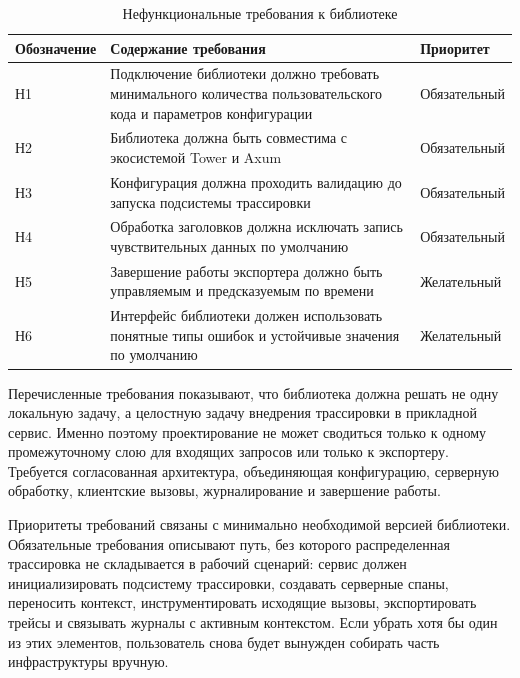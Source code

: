 \begin{table}[H]
    \centering
    \caption{Нефункциональные требования к библиотеке}
    \label{tab:nonfunctional-requirements}
    \renewcommand{\arraystretch}{1.2}
    \begin{tabularx}{\textwidth}{>{\raggedright\arraybackslash}p{1.6cm} >{\raggedright\arraybackslash}X >{\raggedright\arraybackslash}p{2.1cm}}
        \toprule
        Обозначение & Содержание требования & Приоритет \\
        \midrule
        Н1 & Подключение библиотеки должно требовать минимального количества пользовательского кода и параметров конфигурации & Обязательный \\
        \addlinespace
        Н2 & Библиотека должна быть совместима с экосистемой Tower и Axum~\cite{towerDocs,axumDocs} & Обязательный \\
        \addlinespace
        Н3 & Конфигурация должна проходить валидацию до запуска подсистемы трассировки & Обязательный \\
        \addlinespace
        Н4 & Обработка заголовков должна исключать запись чувствительных данных по умолчанию & Обязательный \\
        \addlinespace
        Н5 & Завершение работы экспортера должно быть управляемым и предсказуемым по времени & Желательный \\
        \addlinespace
        Н6 & Интерфейс библиотеки должен использовать понятные типы ошибок и устойчивые значения по умолчанию & Желательный \\
        \bottomrule
    \end{tabularx}
\end{table}

Перечисленные требования показывают, что библиотека должна решать не одну
локальную задачу, а целостную задачу внедрения трассировки в прикладной сервис.
Именно поэтому проектирование не может сводиться только к одному промежуточному
слою для входящих запросов или только к экспортеру. Требуется согласованная
архитектура, объединяющая конфигурацию, серверную обработку, клиентские вызовы,
журналирование и завершение работы.

Приоритеты требований связаны с минимально необходимой версией библиотеки.
Обязательные требования описывают путь, без которого распределенная трассировка
не складывается в рабочий сценарий: сервис должен инициализировать подсистему
трассировки, создавать серверные спаны, переносить контекст, инструментировать
исходящие вызовы, экспортировать трейсы и связывать журналы с активным контекстом.
Если убрать хотя бы один из этих элементов, пользователь снова будет вынужден
собирать часть инфраструктуры вручную.

